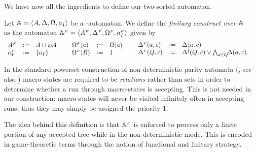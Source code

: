 We have now all the ingredients to define our two-sorted automaton.

\begin{definition}\label{def:finitaryconstruct}
Let $\mathbb{A} = \langle{A,\Delta,\Omega,a_I}\rangle$ be a {\wmso-automaton}.
We define the \emph{finitary construct over $\mathbb{A}$} as the automaton
$\mathbb{A}^{{\scriptscriptstyle F}} = \langle{A^{{\scriptscriptstyle F}},\Delta^{{\scriptscriptstyle F}},\Omega^{{\scriptscriptstyle F}},a_I^{{\scriptscriptstyle F}}}\rangle$ given by
\[
\begin{array}{lll}
   A^{\fin}   &\df&  A \cup \shA
\\ a_I^{\fin} &\df&  \{a_I\}
\end{array}
%
\hspace*{5mm}
%
\begin{array}{lll}
   \pmap^{\fin}(a) &\df& \pmap(a)
\\ \pmap^{\fin}(R) &\df& 1
\end{array}
%
\hspace*{5mm}
%
\begin{array}{lll}
   \tmap^{\fin}(a,c) &\df& \tmap(a,c)
\\ \tmap^{\fin}(Q,c) &\df&
  \shDe(Q,c) \vee \bigwedge_{a \in Q} \! \! \tmap(a,c).
\end{array}
\]
\end{definition}

\begin{remark} 
In the standard powerset construction of non-deterministic parity automata
(\cite{Walukiewicz02}, see also \cite{Ven08,ArnoldN01})
macro-states are required to be \emph{relations} rather than sets in order to
determine whether a run through macro-states is accepting. 
This is not needed in our construction: macro-states will never be visited
infinitely often in accepting runs, thus they may simply be assigned the
priority $1$.
\end{remark}

The idea behind this definition is that $\mathbb{A}^{{\scriptscriptstyle F}}$ is enforced to process only a finite portion of any accepted tree while in the non-deterministic mode. This is encoded in game-theoretic terms through the notion of functional and finitary strategy.

